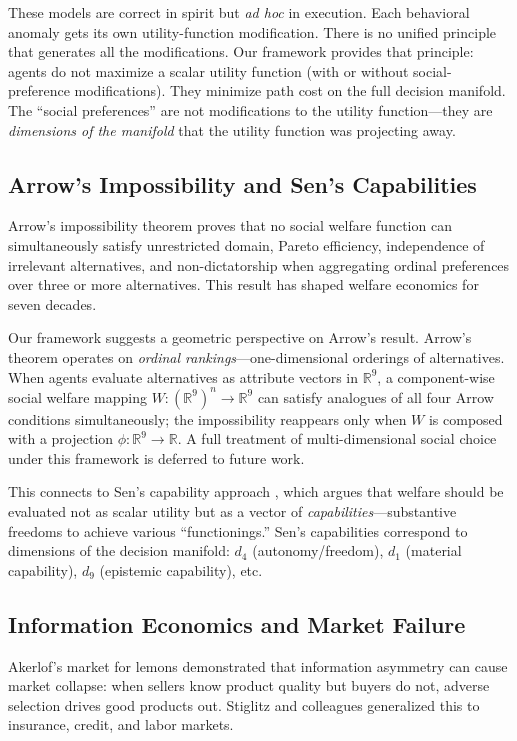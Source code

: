 \documentclass[12pt]{article}
\theoremstyle{definition}
\theoremstyle{remark}
\newcommand{\R}{\mathbb{R}}
\begin{document}
These models are correct in spirit but \emph{ad hoc} in execution.  Each behavioral anomaly gets its own utility-function modification.  There is no unified principle that generates all the modifications.  Our framework provides that principle: agents do not maximize a scalar utility function (with or without social-preference modifications).  They minimize path cost on the full decision manifold.  The ``social preferences'' are not modifications to the utility function---they are \emph{dimensions of the manifold} that the utility function was projecting away.

\subsection{Arrow's Impossibility and Sen's Capabilities}

Arrow's impossibility theorem \cite{arrow1951} proves that no social welfare function can simultaneously satisfy unrestricted domain, Pareto efficiency, independence of irrelevant alternatives, and non-dictatorship when aggregating ordinal preferences over three or more alternatives.  This result has shaped welfare economics for seven decades.

Our framework suggests a geometric perspective on Arrow's result.  Arrow's theorem operates on \emph{ordinal rankings}---one-dimensional orderings of alternatives.  When agents evaluate alternatives as attribute vectors in $\R^9$, a component-wise social welfare mapping $W: (\R^9)^n \to \R^9$ can satisfy analogues of all four Arrow conditions simultaneously; the impossibility reappears only when $W$ is composed with a projection $\phi: \R^9 \to \R$.  A full treatment of multi-dimensional social choice under this framework is deferred to future work.

This connects to Sen's capability approach \cite{sen1999}, which argues that welfare should be evaluated not as scalar utility but as a vector of \emph{capabilities}---substantive freedoms to achieve various ``functionings.''  Sen's capabilities correspond to dimensions of the decision manifold: $d_4$ (autonomy/freedom), $d_1$ (material capability), $d_9$ (epistemic capability), etc.

\subsection{Information Economics and Market Failure}

Akerlof's market for lemons \cite{akerlof1970} demonstrated that information asymmetry can cause market collapse: when sellers know product quality but buyers do not, adverse selection drives good products out.  Stiglitz and colleagues \cite{stiglitz1981} generalized this to insurance, credit, and labor markets.
\end{document}

